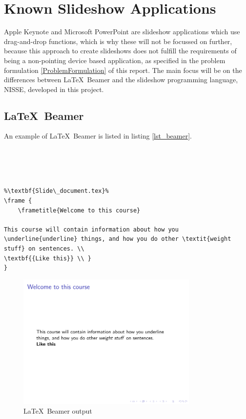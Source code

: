 \chapter{Known Slideshow Applications}
Apple Keynote and Microsoft PowerPoint are slideshow applications which use drag-and-drop functions, which is why these will not be focussed on further, because this approach to create slideshows does not fulfill the requirements of being a non-pointing device based application, as specified in the problem formulation \ref{ProblemFormulation} of this report. The main focus will be on the differences between \LaTeX~Beamer and the slideshow programming language, NISSE, developed in this project.

\section{\LaTeX~Beamer}
An example of \LaTeX~Beamer is listed in listing \ref{lst_beamer}.

\begin{lstlisting}[frame=single, caption={Beamer example}, label=lst_beamer]
%\textbf{Main\_document.tex}%




%\textbf{Slide\_document.tex}%
\frame {
	\frametitle{Welcome to this course}

This course will contain information about how you \underline{underline} things, and how you do other \textit{weight stuff} on sentences. \\
\textbf{{Like this}} \\	}
}
\end{lstlisting}

\begin{figure}[H]
	\centering
		\includegraphics[width=0.8\textwidth]{text/beamer_example.pdf}
	\caption{\LaTeX~Beamer output}
	\label{fig:beamer_example}
\end{figure}

